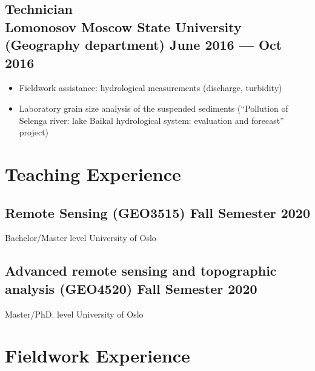 \documentclass[a4,10pt]{article}
\newcommand{\subtext}[1]{
#1\par\vspace{-0.2cm}}
\newenvironment{zitemize}{
\begin{itemize}\itemsep2pt \parskip0pt \parsep1pt}
{\end{itemize}\vspace{-0.5cm}}
\begin{document}
\subsection*{Technician \\Lomonosov Moscow State University (Geography department) \hfill June 2016 --- Oct 2016} 
    \begin{zitemize}
        \item Fieldwork assistance: hydrological measurements (discharge, turbidity)
        \item Laboratory grain size analysis of the suspended sediments (``Pollution of Selenga river: lake Baikal hydrological system: evaluation and forecast'' project)
    \end{zitemize}

\newpage

\section{Teaching Experience}

\subsection*{Remote Sensing (GEO3515) \hfill Fall Semester 2020} 
\subtext{Bachelor/Master level \hfill University of Oslo} 

\subsection*{Advanced remote sensing and topographic analysis (GEO4520) \hfill Fall Semester 2020} 
\subtext{Master/PhD. level \hfill University of Oslo} 



\section{Fieldwork Experience} %
\end{document}
